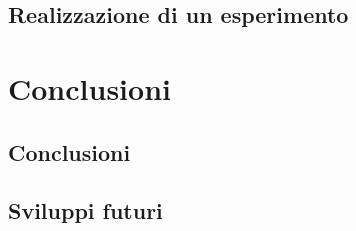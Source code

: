\documentclass [10pt, a4paper, onecolumn, oneside] {scrreprt}
\numberwithin{endnote}{chapter}
\renewcommand{\lstlistlistingname}{Elenco dei codici}}
\begin{document}
	\section{Realizzazione di un esperimento} \label{sez:esperimento}
		 \vfill



\chapter{Conclusioni} \label{cap:conclusioni}
		 \vfill\eject
	\section{Conclusioni} \label{sez:risultati}
		 \vfill
	\section{Sviluppi futuri} \label{sez:sviluppi}
		 \vfill







\eject
\newpage
\thispagestyle{empty}
\mbox{}

\appendix{}
%

\eject
\newpage
\thispagestyle{empty}
\mbox{}

\listoffigures
\begingroup
\let \clearpage \relax
{}
\vfill \listoftables
\vfill \lstlistoflistings
\endgroup
\eject
\newpage
\thispagestyle{empty}
\mbox{}

%


\vfill\eject


\end{document}
